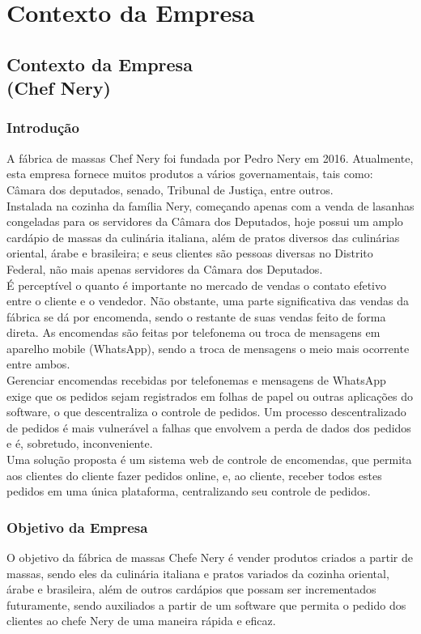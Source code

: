 \part{Contexto da Empresa}
\chapter[Contexto da Empresa]{Contexto da Empresa \\ (Chef Nery)}
{\large {\section { Introdução \\ } } }

{A fábrica de massas Chef Nery foi fundada por Pedro Nery em 2016. Atualmente,
esta empresa fornece muitos produtos a vários governamentais, tais como: Câmara dos
deputados, senado, Tribunal de Justiça, entre outros. \\
}
{\tab Instalada na cozinha da família Nery, começando apenas com a venda de lasanhas
congeladas para os servidores da Câmara dos Deputados, hoje possui um amplo cardápio
de massas da culinária italiana, além de pratos diversos das culinárias oriental, árabe e
brasileira; e seus clientes são pessoas diversas no Distrito Federal, não mais apenas
servidores da Câmara dos Deputados. \\
}
{\tab É perceptível o quanto é importante no mercado de vendas o contato efetivo entre o
cliente e o vendedor. Não obstante, uma parte significativa das vendas da fábrica se dá por
encomenda, sendo o restante de suas vendas feito de forma direta. As encomendas são
feitas por telefonema ou troca de mensagens em aparelho mobile (WhatsApp), sendo a
troca de mensagens o meio mais ocorrente entre ambos. \\
}
{\tab Gerenciar encomendas recebidas por telefonemas e mensagens de WhatsApp exige
que os pedidos sejam registrados em folhas de papel ou outras aplicações do software, o
que descentraliza o controle de pedidos. Um processo descentralizado de pedidos é mais
vulnerável a falhas que envolvem a perda de dados dos pedidos e é, sobretudo,
inconveniente. \\
}
{\tab Uma solução proposta é um sistema web de controle de encomendas, que permita
aos clientes do cliente fazer pedidos online, e, ao cliente, receber todos estes pedidos em
uma única plataforma, centralizando seu controle de pedidos. \\
}

{\large {\section { Objetivo da Empresa \\ } } }

{\tab O objetivo da fábrica de massas Chefe Nery é vender produtos criados a partir de
massas, sendo eles da culinária italiana e pratos variados da cozinha oriental, árabe e
brasileira, além de outros cardápios que possam ser incrementados futuramente, sendo
auxiliados a partir de um software que permita o pedido dos clientes ao chefe Nery de uma
maneira rápida e eficaz.
}
